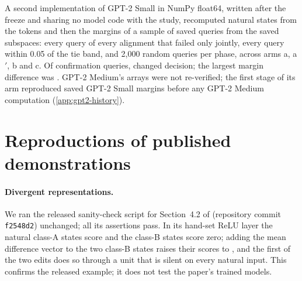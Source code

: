 A second implementation of GPT-2 Small in NumPy float64, written after the freeze and sharing no model code with the
study, recomputed natural states from the tokens and then the margins of a sample of saved queries from the saved
subspaces: every query of every alignment that failed only jointly, every query within 0.05 of the tie band, and 2,000
random queries per phase, across arms a, a$'$, b and c. Of \VerifyQueriesConf{} confirmation queries,
\VerifyDisagreeConf{} changed decision; the largest margin difference was \VerifyMaxGapConf. GPT-2 Medium's arrays
were not re-verified; the first stage of its arm reproduced saved GPT-2 Small margins before any GPT-2 Medium
computation (\cref{app:gpt2-history}).

\section{Reproductions of published demonstrations}\label{app:reproductions}

\paragraph{Divergent representations.}
We ran the released sanity-check script for Section~4.2 of \citet{grant2026divergent} (repository commit
\texttt{f2548d2}) unchanged; all its assertions pass. In its hand-set ReLU layer the natural class-A states score
\GrantNatA{} and the class-B states score zero; adding the mean difference vector to the two class-B states raises
their scores to \GrantPatched{}, and the first of the two edits does so through a unit that is silent on every
natural input. This confirms the released example; it does not test the paper's trained models.

